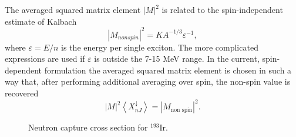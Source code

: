 The averaged squared matrix element $|M|^{2}$ is related to the
spin-independent estimate of Kalbach \cite{Kalbach}
\begin{equation}
|M_{nonspin}|^{2}=KA^{-1/3}\varepsilon^{-1},
\end{equation}
\noindent where $\varepsilon=E/n$ is the energy per single exciton. The more
complicated expressions \cite{Kalbach} are used if $\varepsilon$ is outside
the 7-15 MeV range. In the current, spin-dependent formulation the averaged
squared matrix element is chosen in such a way that, after performing
additional averaging over spin, the non-spin value is recovered
\begin{equation}
|M|^{2}\left\langle X_{nJ}^{\downarrow}\right\rangle =|M_{\text{non spin}%
}|^{2}.
\end{equation}
\begin{figure}[htbp]
\caption{Neutron capture cross section for $^{193}$Ir. }
\label{ir193}
\end{figure}

